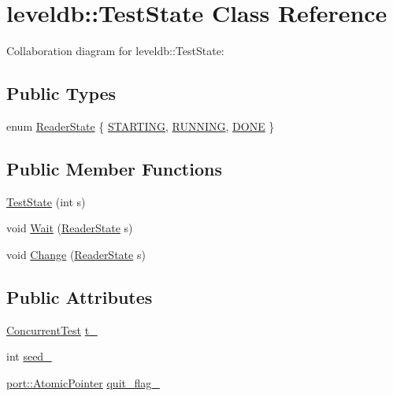 \hypertarget{classleveldb_1_1_test_state}{}\section{leveldb\+:\+:Test\+State Class Reference}
\label{classleveldb_1_1_test_state}


Collaboration diagram for leveldb\+:\+:Test\+State\+:
\subsection*{Public Types}
\begin{DoxyCompactItemize}
\item 
enum \hyperlink{classleveldb_1_1_test_state_a1bf1f0a16815237ff1f29d2925d9a4ad}{Reader\+State} \{ \hyperlink{classleveldb_1_1_test_state_a1bf1f0a16815237ff1f29d2925d9a4ada93ff507fceeb18ff487d343ce24e49fb}{S\+T\+A\+R\+T\+I\+N\+G}, 
\hyperlink{classleveldb_1_1_test_state_a1bf1f0a16815237ff1f29d2925d9a4adab21481f14b9bab70778076d33ea574da}{R\+U\+N\+N\+I\+N\+G}, 
\hyperlink{classleveldb_1_1_test_state_a1bf1f0a16815237ff1f29d2925d9a4ada5d7f032453f326a46f7ebd8b3f0c7d83}{D\+O\+N\+E}
 \}
\end{DoxyCompactItemize}
\subsection*{Public Member Functions}
\begin{DoxyCompactItemize}
\item 
\hyperlink{classleveldb_1_1_test_state_a777f2182bef5c524d580dc26ec589c2d}{Test\+State} (int s)
\item 
void \hyperlink{classleveldb_1_1_test_state_ab11f5574ad50202e18e8274e16953f0a}{Wait} (\hyperlink{classleveldb_1_1_test_state_a1bf1f0a16815237ff1f29d2925d9a4ad}{Reader\+State} s)
\item 
void \hyperlink{classleveldb_1_1_test_state_ae63a695f700220714efa0e622511740c}{Change} (\hyperlink{classleveldb_1_1_test_state_a1bf1f0a16815237ff1f29d2925d9a4ad}{Reader\+State} s)
\end{DoxyCompactItemize}
\subsection*{Public Attributes}
\begin{DoxyCompactItemize}
\item 
\hyperlink{classleveldb_1_1_concurrent_test}{Concurrent\+Test} \hyperlink{classleveldb_1_1_test_state_a090fd0c59fb141c4843511b4020f05e9}{t\+\_\+}
\item 
int \hyperlink{classleveldb_1_1_test_state_aa44f519b574945b0061c88df42fd4725}{seed\+\_\+}
\item 
\hyperlink{classleveldb_1_1port_1_1_atomic_pointer}{port\+::\+Atomic\+Pointer} \hyperlink{classleveldb_1_1_test_state_a04e07cf69866e925db3fafd5cf9fa23f}{quit\+\_\+flag\+\_\+}
\end{DoxyCompactItemize}


